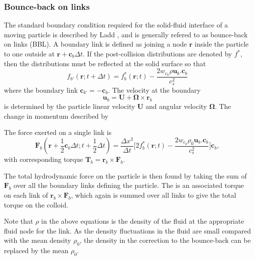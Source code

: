 \subsubsection{Bounce-back on links}

The standard boundary condition required for the solid-fluid
interface of a moving particle is described by Ladd \cite{l94b},
and is generally refered to as bounce-back on links (BBL).
A boundary link is defined as joining a node $\mathbf{r}$
inside the particle to one outside at $\mathbf{r} + \mathbf{c}_b \Delta t$.
If the post-collision distributions are denoted by $f^\ast$, then
the distributions must be reflected at the solid surface so that
\begin{equation}
\label{eq:bbl1}
f_{b'}(\mathbf{r}; t + \Delta t) = f_b^\ast (\mathbf{r}; t)
- \frac{2w_{c_b} \rho \mathbf{u}_b.\mathbf{c}_b}{c_s^2}
\end{equation}
where the boundary link $\mathbf{c}_{b'} = -\mathbf{c}_b$. The velocity
at the boundary
\begin{equation}
\label{eq:ub}
\mathbf{u}_b = \mathbf{U} + \mathbf{\Omega}\times\mathbf{r}_b
\end{equation}
is determined by the particle linear velocity $\mathbf{U}$ and angular
velocity $\mathbf{\Omega}$. The change in momentum described by

The force exerted on a
single link is
\begin{equation}
\mathbf{F}_b(\mathbf{r} + {\scriptstyle\frac{1}{2}}\mathbf{c}_b\Delta t;
t + {\scriptstyle\frac{1}{2}}\Delta t) = \frac{\Delta x^3}{\Delta t}
\Big[ 2f_b^\ast(\mathbf{r}; t) - \frac{2w_{c_b}\rho_0 \mathbf{u}_b .
\mathbf{c}_b}{c_s^2} \Big] \mathbf{c}_b,
\label{eq:fb}
\end{equation}
with corresponding torque $\mathbf{T}_b = \mathbf{r}_b \times \mathbf{F}_b$.




The total hydrodynamic force on the particle is then found by taking
the sum of
$\mathbf{F}_b$ over all the boundary links defining the particle.
The is an associated torque on each link of $\mathbf{r}_b\times\mathbf{F}_b$,
which again is summed over all links to give the total torque on the colloid.

Note that $\rho$ in the above equations is the density of the fluid
at the appropriate fluid node for the link. As the density fluctuations
in the fluid are small compared with the mean density $\rho_0$, the
density in the correction to the bounce-back can be replaced by the
mean $\rho_0$.


